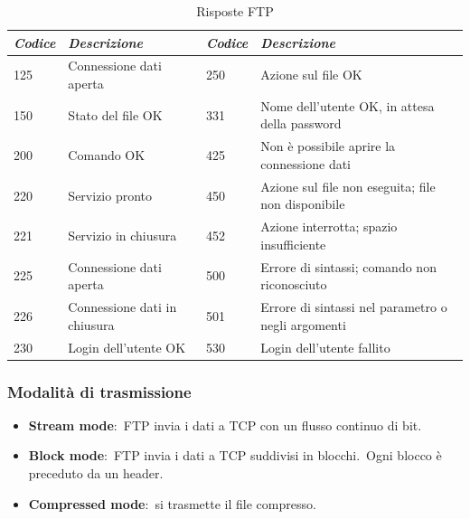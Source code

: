 \begin{table}[H]
    \centering
    \begin{tabular}{|l|m{12em}|l|m{12em}|}
        \hline
        \emph{Codice} & \emph{Descrizione}           & \emph{Codice} & \emph{Descrizione}                                 \\
        \hline
        125           & Connessione dati aperta      & 250           & Azione sul file OK                                 \\
        \hline
        150           & Stato del file OK            & 331           & Nome dell'utente OK, in attesa della password      \\
        \hline
        200           & Comando OK                   & 425           & Non è possibile aprire la connessione dati         \\
        \hline
        220           & Servizio pronto              & 450           & Azione sul file non eseguita; file non disponibile \\
        \hline
        221           & Servizio in chiusura         & 452           & Azione interrotta; spazio insufficiente            \\
        \hline
        225           & Connessione dati aperta      & 500           & Errore di sintassi; comando non riconosciuto       \\
        \hline
        226           & Connessione dati in chiusura & 501           & Errore di sintassi nel parametro o negli argomenti \\
        \hline
        230           & Login dell'utente OK         & 530           & Login dell'utente fallito                          \\
        \hline
    \end{tabular}
    \caption*{Risposte FTP}

\end{table}

\subsubsection{Modalità di trasmissione}

\begin{itemize}
    \item \textbf{Stream mode}:\ FTP invia i dati a TCP con un flusso continuo di bit.
    \item \textbf{Block mode}:\ FTP invia i dati a TCP suddivisi in blocchi.\ Ogni blocco è preceduto da un header.
    \item \textbf{Compressed mode}:\ si trasmette il file compresso.
\end{itemize}

